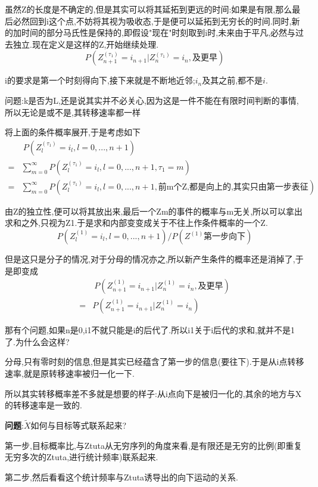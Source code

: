 \documentclass[a4paper,oneside]{ctexbook}
\begin{document}
\begin{pf}[temp孙振尧证明]
					虽然Z的长度是不确定的,但是其实可以将其延拓到更远的时间:如果是有限,那么最后必然回到i这个点,不妨将其视为吸收态,于是便可以延拓到无穷长的时间.同时,新的加时间的部分马氏性是保持的,即假设"现在"时刻取到i时,未来由于平凡,必然与过去独立.现在定义是这样的Z,开始继续处理.
					$$P(Z^{(\tau_1)}_{n+1} = i_{n+1} | Z^{(\tau_1)}_n = i_n, \mbox{及更早})$$
				
					i的要求是第一个时刻得向下,接下来就是不断地近邻;$i_n$及其之前,都不是$i$.
				
					问题:k是否为L,还是说其实并不必关心,因为这是一件不能在有限时间判断的事情,所以无论是或不是,其转移速率都一样
				
					将上面的条件概率展开,于是考虑如下
					\begin{align*}
						&\ P(Z^{(\tau_1)}_{l} = i_{l}, l = 0,...,n+1) \\
						=& \sum_{m=0}^\infty P(Z^{(\tau_1)}_{l} = i_{l}, l = 0,...,n+1,\tau_1 = m) \\
						=& \sum_{m=0}^\infty P(Z^{(\tau_1)}_{l} = i_{l}, l = 0,...,n+1,\mbox{前m个Z,都是向上的,其实只由第一步表征}) 
					\end{align*}

					由Z的独立性,便可以将其放出来,最后一个Zm的事件的概率与m无关,所以可以拿出求和之外,只视为Z1.于是求和内部变变成关于不往上作条件概率的一个Z.
					$$P(Z^{(1)}_{l} = i_{l}, l = 0,...,n+1)/P(Z^{(1)}\mbox{第一步向下})$$

					但是这只是分子的情况,对于分母的情况亦之,所以新产生条件的概率还是消掉了,于是即变成
					\begin{align*}
						&\ P(Z^{(1)}_{n+1} = i_{n+1} | Z^{(1)}_n = i_n, \mbox{及更早}) \\
						=& P(Z^{(1)}_{n+1} = i_{n+1} | Z^{(1)}_n = i_n)
					\end{align*}

					那有个问题,如果n是0,i1不就只能是i的后代了.所以i1关于i后代的求和,就并不是1了.为什么会这样?

					分母,只有零时刻的信息,但是其实已经蕴含了第一步的信息(要往下).于是从i点转移速率,就是原转移速率被归一化一下.

					所以其实转移概率差不多就是想要的样子:从i点向下是被归一化的,其余的地方与X的转移速率是一致的.
				
				\qquad \textbf{问题}:$\tilde{X}$如何与目标等式联系起来?

					第一步,目标概率比,与Ztuta从无穷序列的角度来看,是有限还是无穷的比例(即重复无穷多次的Ztuta,进行统计频率)联系起来.

					第二步,然后看看这个统计频率与Ztuta诱导出的向下运动的关系.


\end{pf}
\end{document}
